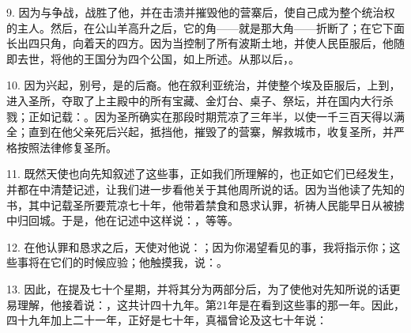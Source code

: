 9. 因为与争战，战胜了他，并在击溃并摧毁他的营寨后，使自己成为整个统治权的主人。然后，在公山羊高升之后，它的角——就是那大角——折断了；在它下面长出四只角，向着天的四方。因为当控制了所有波斯土地，并使人民臣服后，他随即去世，将他的王国分为四个公国，如上所述。从那以后，。\par

10. 因为兴起，别号，是的后裔。他在叙利亚统治，并使整个埃及臣服后，上到，进入圣所，夺取了上主殿中的所有宝藏、金灯台、桌子、祭坛，并在国内大行杀戮；正如记载：。因为圣所确实在那段时期荒凉了三年半，以使一千三百天得以满全；直到在他父亲死后兴起，抵挡他，摧毁了的营寨，解救城市，收复圣所，并严格按照法律修复圣所。\par

11. 既然天使也向先知叙述了这些事，正如我们所理解的，也正如它们已经发生，并都在中清楚记述，让我们进一步看他关于其他周所说的话。因为当他读了先知的书，其中记载圣所要荒凉七十年，他带着禁食和恳求认罪，祈祷人民能早日从被掳中归回城。于是，他在记述中这样说：，等等。\par

12. 在他认罪和恳求之后，天使对他说：；因为你渴望看见的事，我将指示你；这些事将在它们的时候应验；他触摸我，说：。\par

13. 因此，在提及七十个星期，并将其分为两部分后，为了使他对先知所说的话更易理解，他接着说：，这共计四十九年。第21年是在看到这些事的那一年。因此，四十九年加上二十一年，正好是七十年，真福曾论及这七十年说：\par

